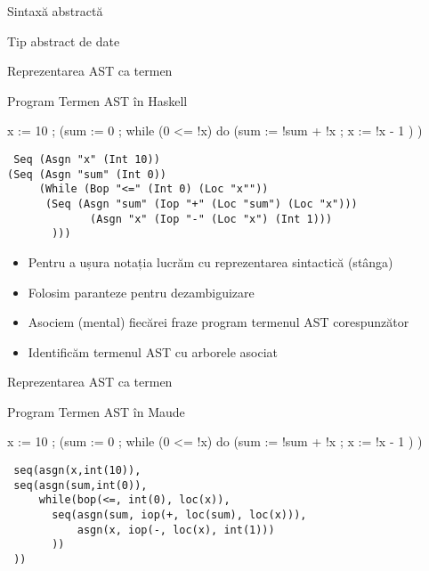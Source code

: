 \documentclass[xcolor=pdftex,romanian,colorlinks]{beamer}
\begin{document}
\begin{section}{Sintaxă abstractă}
\begin{subsection}{Tip abstract de date}
\begin{frame}[fragile]{Reprezentarea AST ca termen}
\begin{block}{Program\hspace{8em} Termen AST în Haskell}
\begin{minipage}{.3\columnwidth}
\begin{asciic}
 x := 10 ;
(sum := 0 ;
 while (0 <= !x)  do 
   (sum := !sum + !x ;
    x := !x - 1
   )
 )
\end{asciic}
\end{minipage}\hfill
\begin{minipage}{.7\columnwidth}
\footnotesize
\begin{verbatim}
 Seq (Asgn "x" (Int 10))
(Seq (Asgn "sum" (Int 0))
     (While (Bop "<=" (Int 0) (Loc "x""))
      (Seq (Asgn "sum" (Iop "+" (Loc "sum") (Loc "x")))
             (Asgn "x" (Iop "-" (Loc "x") (Int 1)))
       )))
\end{verbatim}
\end{minipage}
\end{block}
\begin{itemize}
\item Pentru a ușura notația lucrăm cu reprezentarea sintactică (stânga)
\item Folosim paranteze pentru dezambiguizare
\item Asociem (mental) fiecărei fraze program termenul AST corespunzător
\item Identificăm termenul AST cu arborele asociat
\end{itemize}
\end{frame}

\begin{frame}[fragile]{Reprezentarea AST ca termen}
\begin{block}{Program\hspace{8em} Termen AST în Maude}
\begin{minipage}{.3\columnwidth}
\begin{asciic}
 x := 10 ;
(sum := 0 ;
 while (0 <= !x)  do 
   (sum := !sum + !x ;
    x := !x - 1
   )
 )
\end{asciic}
\end{minipage}\hfill
\begin{minipage}{.64\columnwidth}
\footnotesize
\begin{verbatim}
 seq(asgn(x,int(10)),
 seq(asgn(sum,int(0)),
     while(bop(<=, int(0), loc(x)),
       seq(asgn(sum, iop(+, loc(sum), loc(x))),
           asgn(x, iop(-, loc(x), int(1)))
       ))
 ))
\end{verbatim}
\end{minipage}
\end{block}
\end{frame}

\end{subsection}
\end{section}
\end{document}
